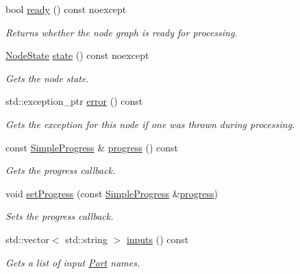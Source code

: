 \begin{DoxyCompactItemize}
bool \hyperlink{classdg_1_1deepcore_1_1_node_afc7c3bc36d0cb169e931495b77939a4c}{ready} () const noexcept
\begin{DoxyCompactList}\small\item\em Returns whether the node graph is ready for processing. \end{DoxyCompactList}\item 
\hyperlink{group___process_framework_ga6cb7b5530ce6ccea164f9157b5b2cc0a}{Node\+State} \hyperlink{classdg_1_1deepcore_1_1_node_a6d99e9f00dd745d25502a14cb13fd272}{state} () const noexcept
\begin{DoxyCompactList}\small\item\em Gets the node state. \end{DoxyCompactList}\item 
std\+::exception\+\_\+ptr \hyperlink{classdg_1_1deepcore_1_1_node_a399a9adb12290cebb1111a4675f2b4ca}{error} () const 
\begin{DoxyCompactList}\small\item\em Gets the exception for this node if one was thrown during processing. \end{DoxyCompactList}\item 
const \hyperlink{group___utility_module_ga6763018df79e4bdbcd8cd14cea5342b2}{Simple\+Progress} \& \hyperlink{classdg_1_1deepcore_1_1_node_a500a8cb8d1f8f8438025fe196aea04ab}{progress} () const 
\begin{DoxyCompactList}\small\item\em Gets the progress callback. \end{DoxyCompactList}\item 
void \hyperlink{classdg_1_1deepcore_1_1_node_a0df605b929a12467207cf63320676d5a}{set\+Progress} (const \hyperlink{group___utility_module_ga6763018df79e4bdbcd8cd14cea5342b2}{Simple\+Progress} \&\hyperlink{classdg_1_1deepcore_1_1_node_a500a8cb8d1f8f8438025fe196aea04ab}{progress})
\begin{DoxyCompactList}\small\item\em Sets the progress callback. \end{DoxyCompactList}\item 
std\+::vector$<$ std\+::string $>$ \hyperlink{classdg_1_1deepcore_1_1_node_a1e89da6fe3941b07685f0f57e6d2a4c6}{inputs} () const 
\begin{DoxyCompactList}\small\item\em Gets a list of input \hyperlink{classdg_1_1deepcore_1_1_port}{Port} names. \end{DoxyCompactList}\item 

\end{DoxyCompactItemize}
